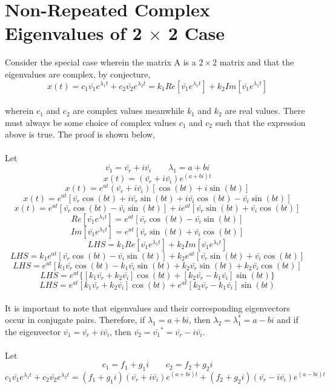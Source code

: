 \section{Non-Repeated Complex Eigenvalues of 2 $\times$ 2 Case}
\begin{comment}
\end{comment}
Consider the special case wherein the matrix A is a $2\times2$ matrix and that the eigenvalues are complex, by conjecture,
$$x(t) = c_1\bar{v_1}e^{\lambda_1 t} + c_2\bar{v_2}e^{\lambda_2 t} = k_1Re[\bar{v_1}e^{\lambda_1 t}] + k_2Im[\bar{v_1}e^{\lambda_1 t}]$$
\\wherein $c_1$ and $c_2$ are complex values meanwhile $k_1$ and $k_2$ are real values. There must always be some choice of complex values $c_1$ and $c_2$ such that the expression above is true. The proof is shown below,
\\~\\Let 
$$\bar{v_1} = \bar{v_r} + i\bar{v_i}\qquad \lambda_1 = a + bi$$
$$x(t) = (\bar{v_r} + i\bar{v_i})e^{(a+bi)t}$$
$$x(t) = e^{at}(\bar{v_r} + i\bar{v_i})[\cos{(bt)} + i\sin{(bt)}]$$
$$x(t) = e^{at}[\bar{v_r}\cos{(bt)} + i\bar{v_r}\sin{(bt)} + i\bar{v_i}\cos{(bt)} - \bar{v_i}\sin{(bt)}]$$
$$x(t) = e^{at}[\bar{v_r}\cos{(bt)} - \bar{v_i}\sin{(bt)}]+ ie^{at}[\bar{v_r}\sin{(bt)} + \bar{v_i}\cos{(bt)}]$$
$$Re[\bar{v_1}e^{\lambda_1 t}] = e^{at}[\bar{v_r}\cos{(bt)} - \bar{v_i}\sin{(bt)}]$$
$$Im[\bar{v_1}e^{\lambda_1 t}] = e^{at}[\bar{v_r}\sin{(bt)} + \bar{v_i}\cos{(bt)}]$$
$$LHS = k_1Re[\bar{v_1}e^{\lambda_1 t}] + k_2Im[\bar{v_1}e^{\lambda_1 t}]$$
$$LHS = k_1e^{at}[\bar{v_r}\cos{(bt)} - \bar{v_i}\sin{(bt)}] + k_2e^{at}[\bar{v_r}\sin{(bt)} + \bar{v_i}\cos{(bt)}]$$
$$LHS = e^{at}[k_1\bar{v_r}\cos{(bt)} - k_1\bar{v_i}\sin{(bt)} + k_2\bar{v_r}\sin{(bt)} + k_2\bar{v_i}\cos{(bt)}]$$
$$LHS = e^{at}\{[k_1\bar{v_r}+ k_2\bar{v_i}]\cos{(bt)}  + [k_2\bar{v_r}- k_1\bar{v_i}]\sin{(bt)}\}$$
$$LHS = e^{at}[k_1\bar{v_r}+ k_2\bar{v_i}]\cos{(bt)}  + e^{at}[k_2\bar{v_r}- k_1\bar{v_i}]\sin{(bt)}$$
\\It is important to note that eigenvalues and their corresponding eigenvectors occur in conjugate pairs. Therefore, if $\lambda_1 = a+bi$, then $\lambda_2 = \lambda_1^\ast = a - bi$ and if the eigenvector $\bar{v_1} = \bar{v_r} + i\bar{v_i}$, then $\bar{v_2} =\bar{v_1}^\ast= \bar{v_r} - i\bar{v_i}$.
\\~\\Let
$$c_1 = f_1 + g_1i\qquad c_2 = f_2 + g_2i$$
$$c_1\bar{v_1}e^{\lambda_1 t} + c_2\bar{v_2}e^{\lambda_2 t} = (f_1 + g_1i)(\bar{v_r} + i\bar{v_i})e^{(a+bi)t} + (f_2 + g_2i)(\bar{v_r} - i\bar{v_i})e^{(a-bi)t}$$
